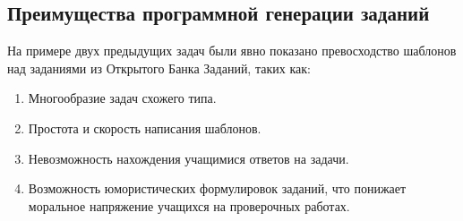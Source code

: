\subsection{Преимущества программной генерации заданий}
На примере двух предыдущих задач были явно показано превосходство шаблонов над заданиями из Открытого Банка Заданий, таких как:
\begin{enumerate}
    \item Многообразие задач схожего типа.
    \item Простота и скорость написания шаблонов.
    \item Невозможность нахождения учащимися ответов на задачи.
    \item Возможность юмористических формулировок заданий, что понижает моральное напряжение учащихся на проверочных работах.%
\end{enumerate}

